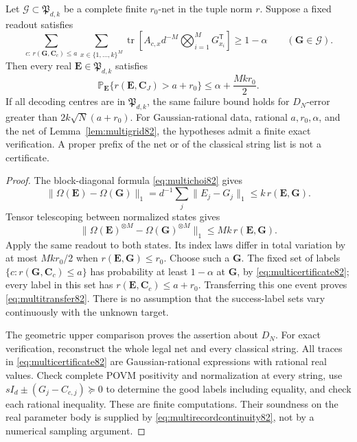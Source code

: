 \begin{theorem}
\label{thm:multicertificate82}
Let $\mathcal G\subset\mathfrak P_{d,k}$ be a complete finite
$r_0$-net in the tuple norm $r$.  Suppose a fixed readout satisfies
\begin{equation}\label{eq:multicertificate82}
 \sum_{c:\,r(\boldsymbol G,\boldsymbol C_c)\le a}
 \sum_{x\in\{1,\ldots,k\}^M}
 \operatorname{tr}\left[A_{c,x}
        d^{-M}\bigotimes_{i=1}^M G_{x_i}^{\mathsf T}\right]
 \ge1-\alpha\qquad(\boldsymbol G\in\mathcal G).
\end{equation}
Then every real $\boldsymbol E\in\mathfrak P_{d,k}$ satisfies
\begin{equation}\label{eq:multitransfer82}
 \mathbb P_{\boldsymbol E}
   \{r(\boldsymbol E,\boldsymbol C_J)>a+r_0\}
 \le\alpha+\frac{Mk r_0}{2}.
\end{equation}
If all decoding centres are in $\mathfrak P_{d,k}$, the same failure
bound holds for $D_N$-error greater than $2k\sqrt N(a+r_0)$.
For Gaussian-rational data, rational $a,r_0,\alpha$, and the net
of Lemma~\ref{lem:multigrid82}, the hypotheses admit a finite exact
verification.  A proper prefix of the net or of the classical
string list is not a certificate.
\end{theorem}
\begin{proof}
The block-diagonal formula \eqref{eq:multichoi82} gives
\[
 \|\Omega(\boldsymbol E)-\Omega(\boldsymbol G)\|_1
    =d^{-1}\sum_j\|E_j-G_j\|_1
    \le k\,r(\boldsymbol E,\boldsymbol G).
\]
Tensor telescoping between normalized states gives
\begin{equation}\label{eq:multirecordcontinuity82}
 \|\Omega(\boldsymbol E)^{\otimes M}
           -\Omega(\boldsymbol G)^{\otimes M}\|_1
       \le Mk\,r(\boldsymbol E,\boldsymbol G).
\end{equation}
Apply the same readout to both states.  Its index laws differ in
total variation by at most $Mk r_0/2$ when
$r(\boldsymbol E,\boldsymbol G)\le r_0$.
Choose such a $\boldsymbol G$.  The fixed set of labels
$\{c:r(\boldsymbol G,\boldsymbol C_c)\le a\}$ has probability
at least $1-\alpha$ at $\boldsymbol G$, by
\eqref{eq:multicertificate82}; every label in this set has
$r(\boldsymbol E,\boldsymbol C_c)\le a+r_0$.
Transferring this one event proves \eqref{eq:multitransfer82}.
There is no assumption that the success-label sets vary continuously
with the unknown target.

The geometric upper comparison proves the assertion about $D_N$.
For exact verification, reconstruct the whole legal net and every
classical string.  All traces in \eqref{eq:multicertificate82} are
Gaussian-rational expressions with rational real values.  Check
complete POVM positivity and normalization at every string, use
$sI_d\pm(G_j-C_{c,j})\succeq0$ to determine the good labels
including equality, and check each rational inequality.  These are
finite computations.  Their soundness on the real parameter body
is supplied by \eqref{eq:multirecordcontinuity82}, not by a numerical
sampling argument.
\end{proof}

